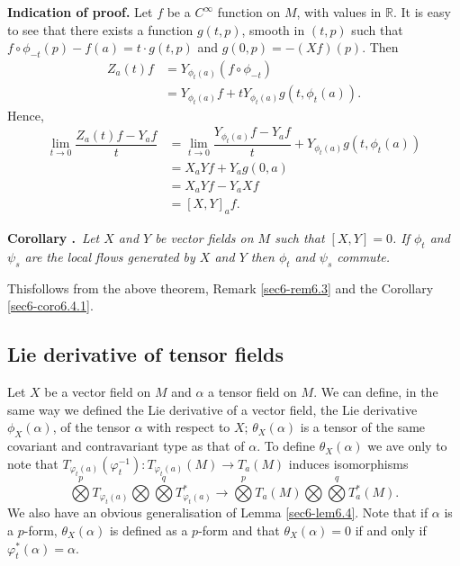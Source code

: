 \noindent
{\bf Indication of proof.}
Let $f$ be a $C^{\infty}$ function on $M$, with values in $\mathbb{R}$. It is easy to see that there exists a function $g(t,p)$, smooth in $(t,p)$ such that $f\circ \phi_{-t}(p)-f(a)=t\cdot g(t,p)$ and $g(0,p)=-(Xf)(p)$. Then 
\begin{align*}
Z_{a}(t)f &= Y_{\phi_{t}(a)}(f\circ \phi_{-t})\\[3pt]
         &= Y_{\phi_{t}(a)}f+tY_{\phi_{t}(a)}g(t,\phi_{t}(a)).
\end{align*}
Hence,
\begin{align*}
\lim\limits_{t\to 0}\dfrac{Z_{a}(t)f-Y_{a}f}{t} &= \lim\limits_{t\to 0}\dfrac{Y_{\phi_{t}(a)}f-Y_{a}f}{t}+Y_{\phi_{t}(a)}g(t,\phi_{t}(a))\\[3pt]
                                             &= X_{a}Yf+Y_{a}g(0,a)\\[3pt]
                                             &= X_{a}Yf-Y_{a}Xf\\[3pt]
                                             &= [X,Y]_{a}f.
\end{align*}

\noindent
{\bf Corollary .\label{sec6-coro6.5.1}}~{\em Let\label{page26} $X$ and $Y$ be vector fields on $M$ such that $[X,Y]=0$. If $\phi_{t}$ and $\psi_{s}$ are the local flows generated by $X$ and $Y$ then $\phi_{t}$ and $\psi_{s}$ commute.}
\smallskip

This\pageoriginale follows from the above theorem, Remark \ref{sec6-rem6.3} and the Corollary \ref{sec6-coro6.4.1}.

\subsection*{Lie derivative of tensor fields}

Let $X$ be a vector field on $M$ and $\alpha$ a tensor field on $M$. We can define, in the same way we defined the Lie derivative of a vector field, the Lie derivative $\phi_{X}(\alpha)$, of the tensor $\alpha$ with respect to $X$; $\theta_{X}(\alpha)$ is a tensor of the same covariant and contravariant type as that of $\alpha$. To define $\theta_{X}(\alpha)$ we ave only to note that $T_{\varphi_{t}(a)}(\varphi^{-1}_{t}):T_{\varphi_{t}(a)}(M)\to T_{a}(M)$ induces isomorphisms
$$
\bigotimes\limits^{p}T_{\varphi_{t}(a)}\bigotimes \bigotimes\limits^{q}T^{*}_{\varphi_{t}(a)}\to \bigotimes\limits^{p}T_{a}(M)\bigotimes \bigotimes\limits^{q} T^{*}_{a}(M).
$$
We also have an obvious generalisation of Lemma \ref{sec6-lem6.4}. Note that if $\alpha$ is a $p$-form, $\theta_{X}(\alpha)$ is defined as a $p$-form and that $\theta_{X}(\alpha)=0$ if and only if $\varphi^{*}_{t}(\alpha)=\alpha$.

